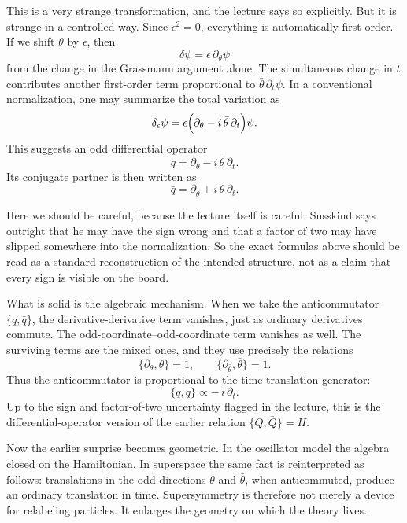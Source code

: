This is a very strange transformation, and the lecture says so explicitly. But it is strange in a controlled way. Since \(\epsilon^2=0\), everything is automatically first order. If we shift \(\theta\) by \(\epsilon\), then
\begin{equation}
\delta\psi = \epsilon\,\partial_\theta\psi
\end{equation}
from the change in the Grassmann argument alone. The simultaneous change in \(t\) contributes another first-order term proportional to \(\bar\theta\,\partial_t\psi\). In a conventional normalization, one may summarize the total variation as
\begin{equation}
\delta_\epsilon\psi
=
\epsilon\Bigl(\partial_\theta-i\,\bar\theta\,\partial_t\Bigr)\psi.
\end{equation}
This suggests an odd differential operator
\begin{equation}
q=\partial_\theta-i\,\bar\theta\,\partial_t.
\end{equation}
Its conjugate partner is then written as
\begin{equation}
\bar q=\partial_{\bar\theta}+i\,\theta\,\partial_t.
\end{equation}

Here we should be careful, because the lecture itself is careful. Susskind says outright that he may have the sign wrong and that a factor of two may have slipped somewhere into the normalization. So the exact formulas above should be read as a standard reconstruction of the intended structure, not as a claim that every sign is visible on the board.

What is solid is the algebraic mechanism. When we take the anticommutator \(\{q,\bar q\}\), the derivative-derivative term vanishes, just as ordinary derivatives commute. The odd-coordinate--odd-coordinate term vanishes as well. The surviving terms are the mixed ones, and they use precisely the relations
\begin{equation}
\{\partial_\theta,\theta\}=1,
\qquad
\{\partial_{\bar\theta},\bar\theta\}=1.
\end{equation}
Thus the anticommutator is proportional to the time-translation generator:
\begin{equation}
\{q,\bar q\}\propto -\,i\,\partial_t.
\end{equation}
Up to the sign and factor-of-two uncertainty flagged in the lecture, this is the differential-operator version of the earlier relation \(\{Q,\bar Q\}=H\).

Now the earlier surprise becomes geometric. In the oscillator model the algebra closed on the Hamiltonian. In superspace the same fact is reinterpreted as follows: translations in the odd directions \(\theta\) and \(\bar\theta\), when anticommuted, produce an ordinary translation in time. Supersymmetry is therefore not merely a device for relabeling particles. It enlarges the geometry on which the theory lives.

